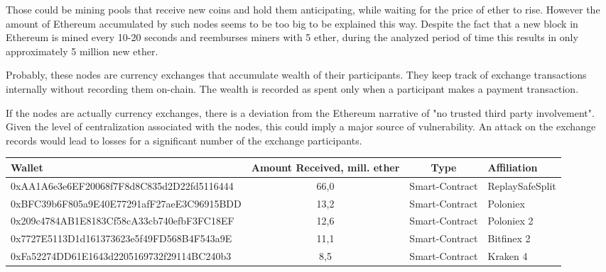 Those could be mining pools that receive new coins and hold them anticipating, while waiting for the price of ether to rise.
However the amount of Ethereum accumulated by such nodes seems to be too big to be explained this way.
Despite the fact that a new block in Ethereum is mined every 10-20 seconds and reemburses miners with 5 ether, during the analyzed period of time this results in only approximately 5 million new ether.

Probably, these nodes are currency exchanges that accumulate wealth of their participants. 
They keep track of exchange transactions internally without recording them on-chain. 
The wealth is recorded as spent only when a participant makes a payment transaction.

If the nodes are actually currency exchanges, there is a deviation from the Ethereum narrative of "no trusted third party involvement".
Given the level of centralization associated with the nodes, this could imply a major source of vulnerability.
An attack on the exchange records would lead to losses for a significant number of the exchange participants.

\begin{table}
\centering
{} 
\label{tab:t5mr} 
\begin{adjustbox}{width=0.9\linewidth}
\begin{tabular}{lccl}
  \hline
Wallet & Amount Received, mill. ether & Type & Affiliation \\
  \hline
  0xAA1A6e3e6EF20068f7F8d8C835d2D22fd5116444 & 66,0 & Smart-Contract & ReplaySafeSplit \\ 
  0xBFC39b6F805a9E40E77291afF27aeE3C96915BDD & 13,2 & Smart-Contract & Poloniex \\ 
  0x209c4784AB1E8183Cf58cA33cb740efbF3FC18EF & 12,6 & Smart-Contract & Poloniex 2 \\ 
  0x7727E5113D1d161373623e5f49FD568B4F543a9E & 11,1 & Smart-Contract & Bitfinex 2 \\ 
  0xFa52274DD61E1643d2205169732f29114BC240b3 & 8,5 & Smart-Contract & Kraken 4 \\ 
   \hline
\end{tabular}
\end{adjustbox}
\end{table}

